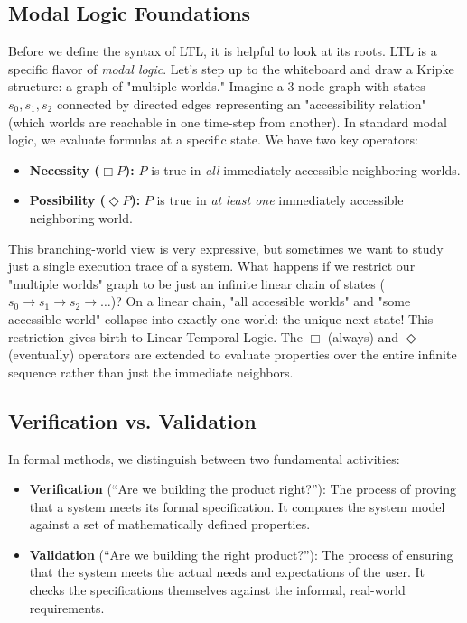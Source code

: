 \subsection{Modal Logic Foundations}
Before we define the syntax of LTL, it is helpful to look at its roots. LTL is a specific flavor of \emph{modal logic}. Let's step up to the whiteboard and draw a Kripke structure: a graph of "multiple worlds." 
Imagine a 3-node graph with states $s_0, s_1, s_2$ connected by directed edges representing an "accessibility relation" (which worlds are reachable in one time-step from another). In standard modal logic, we evaluate formulas at a specific state. We have two key operators:
\begin{itemize}
    \item \textbf{Necessity ($\Box P$):} $P$ is true in \emph{all} immediately accessible neighboring worlds.
    \item \textbf{Possibility ($\Diamond P$):} $P$ is true in \emph{at least one} immediately accessible neighboring world.
\end{itemize}
This branching-world view is very expressive, but sometimes we want to study just a single execution trace of a system. What happens if we restrict our "multiple worlds" graph to be just an infinite linear chain of states ($s_0 \to s_1 \to s_2 \to \dots$)? On a linear chain, "all accessible worlds" and "some accessible world" collapse into exactly one world: the unique next state! This restriction gives birth to Linear Temporal Logic. The $\Box$ (always) and $\Diamond$ (eventually) operators are extended to evaluate properties over the entire infinite sequence rather than just the immediate neighbors.

\subsection{Verification vs. Validation}
In formal methods, we distinguish between two fundamental activities:
\begin{itemize}
    \item \textbf{Verification} (``Are we building the product right?''): The process of proving that a system meets its formal specification. It compares the system model against a set of mathematically defined properties.
    \item \textbf{Validation} (``Are we building the right product?''): The process of ensuring that the system meets the actual needs and expectations of the user. It checks the specifications themselves against the informal, real-world requirements.
\end{itemize}

